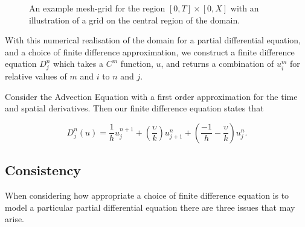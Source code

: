 \documentclass[../main.tex]{subfiles}
\begin{document}
  \begin{figure}[hbt]
    \centering

    \caption{An example mesh-grid for the region $[0, T] \times [0, X]$ with an illustration of a grid on the central region of the domain. \label{diff:fig:meshgrid}}
  \end{figure}

  With this numerical realisation of the domain for a partial differential equation, and a choice of finite difference approximation, we construct a finite difference equation $D^n_j$ which takes a $C^m$ function, $u$, and returns a combination of $u^m_i$ for relative values of $m$ and $i$ to $n$ and $j$.

  \begin{example}
    Consider the Advection Equation with a first order approximation for the time and spatial derivatives. Then our finite difference equation states that

    \begin{equation} \label{diff:eq:advectionexample}
      D^n_j(u) = \frac{1}{h} u^{n+1}_j + \left( \frac{\upsilon}{k} \right) u^n_{j+1} + \left( \frac{-1}{h} - \frac{\upsilon}{k} \right) u^n_j.
    \end{equation}
  \end{example}

  \subsection{Consistency} \label{diff:sec:consistency}
  When considering how appropriate a choice of finite difference equation is to model a particular partial differential equation there are three issues that may arise.
\end{document}
